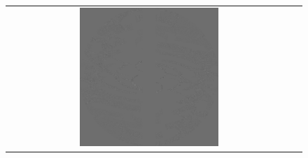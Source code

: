 \documentclass[a4paper,12pt]{article}
\begin{document}
\begin{figure}
\begin{tabular}{cc}
                                                                                                                                                                                                                                                                                                                                                                                                                                                                                                                                                                                                                                                                                                                                                                                                                                                                                      \includegraphics[width=0.5\textwidth]{vismapimafter.pdf}

\end{tabular}
\end{figure}
\end{document}
